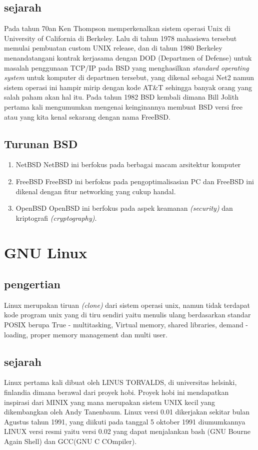 \subsection{sejarah}
	Pada tahun 70an Ken Thompson memperkenalkan sistem operasi Unix di University of California di Berkeley. Lalu di tahun 1978 mahasiswa tersebut memulai pembuatan custom UNIX release, dan di tahun 1980 Berkeley menandatangani kontrak kerjasama dengan DOD (Departmen of Defense) untuk masalah penggunaan TCP/IP pada BSD yang menghasilkan \textit{standard operating system} untuk komputer di departmen tersebut, yang dikenal sebagai Net2 namun sistem operasi ini hampir mirip dengan kode AT\&T sehingga banyak orang yang salah paham akan hal itu. Pada tahun 1982 BSD kembali dimana Bill Jolith pertama kali mengumumkan mengenai keinginannya membuat BSD versi free atau yang kita kenal sekarang dengan nama FreeBSD.
\subsection{Turunan BSD}
\begin{enumerate}
\item NetBSD
NetBSD ini berfokus pada berbagai macam arsitektur komputer
\item FreeBSD
FreeBSD ini berfokus pada pengoptimalisasian PC dan FreeBSD ini dikenal dengan fitur networking yang cukup handal.
\item OpenBSD
OpenBSD ini berfokus pada aspek keamanan \textit{(security)} dan kriptografi \textit{(cryptography)}.
\end{enumerate}

\section{GNU Linux}
\subsection{pengertian}
	Linux merupakan tiruan \textit{(clone)} dari sistem operasi unix, namun tidak terdapat kode program unix yang di tiru sendiri yaitu  menulis ulang berdasarkan standar POSIX berupa True - multitasking, Virtual memory, shared libraries, demand - loading, proper memory management dan multi user.
\subsection{sejarah}
	Linux pertama kali dibuat oleh LINUS TORVALDS, di universitas helsinki, finlandia	dimana berawal dari proyek hobi. Proyek hobi ini mendapatkan inspirasi dari MINIX yang mana merupakan sistem UNIX kecil yang dikembangkan oleh Andy Tanenbaum. Linux versi 0.01 dikerjakan sekitar bulan Agustus tahun 1991, yang diikuti pada tanggal 5 oktober 1991 diumumkannya LINUX versi resmi yaitu versi 0.02 yang dapat menjalankan bash (GNU Bourne Again Shell) dan GCC(GNU C COmpiler).